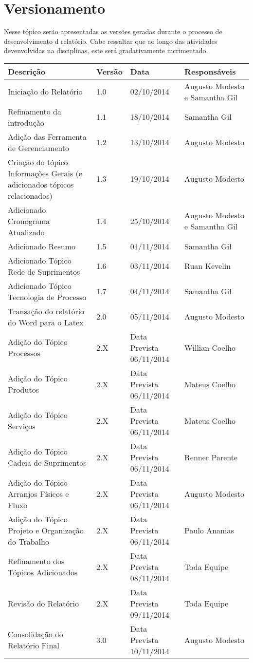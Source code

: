 \chapter[Versionamento]{Versionamento}
\label{chap:versionamento}
	Nesse tópico serão apresentadas as versões geradas durante o processo de desenvolvimento d relatório. Cabe ressaltar que ao longo das atividades devenvolvidas na disciplinas, este será gradativamente incrimentado.
	
	\label{subsubsec:versionamento_talbe}
		\begin{table}[h]
			\centering
			\begin{tabular}{|p{6cm}|p{1.5cm}|p{2.5cm}|p{4cm}|}
				
				\hline
				
				Descrição & Versão & Data & Responsáveis \\ \hline
				Iniciação do Relatório & 1.0 & 02/10/2014 & Augusto Modesto e Samantha Gil \\ \hline
				Refinamento da introdução & 1.1 & 18/10/2014 & Samantha Gil \\ \hline
				Adição das Ferramenta de Gerenciamento & 1.2 & 13/10/2014 & Augusto Modesto \\ \hline
				Criação do tópico Informações Gerais (e adicionados tópicos relacionados) & 1.3 & 19/10/2014 & Augusto Modesto \\ \hline
				Adicionado Cronograma Atualizado & 1.4 & 25/10/2014 & Augusto Modesto e Samantha Gil \\ \hline
				Adicionado Resumo & 1.5 & 01/11/2014 & Samantha Gil \\ \hline
				Adicionado Tópico Rede de Suprimentos & 1.6 & 03/11/2014 & Ruan Kevelin \\ \hline
				Adicionado Tópico Tecnologia de Processo & 1.7 & 04/11/2014 & Samantha Gil \\ \hline
				Transação do relatório do Word para o Latex & 2.0 & 05/11/2014 & Augusto Modesto \\ \hline
				Adição do Tópico Processos & 2.X & Data Prevista 06/11/2014 & Willian Coelho \\ \hline
				Adição do Tópico Produtos & 2.X & Data Prevista 06/11/2014 & Mateus Coelho \\ \hline
				Adição do Tópico Serviços & 2.X & Data Prevista 06/11/2014 & Mateus Coelho \\ \hline
				Adição do Tópico Cadeia de Suprimentos & 2.X & Data Prevista 06/11/2014 & Renner Parente \\ \hline
				Adição do Tópico Arranjos Físicos e Fluxo & 2.X & Data Prevista 06/11/2014 & Augusto Modesto \\ \hline
				Adição do Tópico Projeto e Organização do Trabalho & 2.X & Data Prevista 06/11/2014 & Paulo Ananias \\ \hline
				Refinamento dos Tópicos Adicionados & 2.X & Data Prevista 08/11/2014 & Toda Equipe \\ \hline
				Revisão do Relatório & 2.X & Data Prevista 09/11/2014 & Toda Equipe \\ \hline
				Consolidação do Relatório Final & 3.0 & Data Prevista 10/11/2014 & Augusto Modesto \\ \hline				


\end{tabular}
\end{table}
